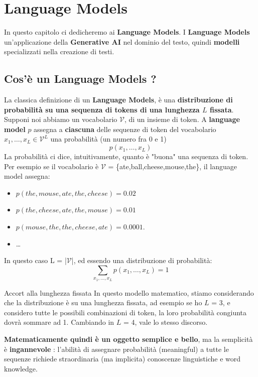 \chapter{Language Models}
In questo capitolo ci dedicheremo ai \textbf{Language Models}.
I \textbf{Language Models} un'applicazione della \textbf{Generative AI} nel dominio del testo, quindi \textbf{modelli} specializzati nella creazione di testi.
\section{Cos'è un Language Models ?}
La classica definizione di un \textbf{Language Models}, è una \textbf{distribuzione di probabilità su una sequenza di tokens di una lunghezza $L$ fissata}.
Supponi noi abbiamo un vocabolario $\mathcal{V}$, di un insieme di token.
A \textbf{language model} $p$ assegna a \textbf{ciascuna} delle sequenze di token del vocabolario $x_1,\dots,x_L \in \mathcal{V}^L$ una probabilità (un numero fra 0 e 1)
\begin{equation}
    p(x_1,\dots,x_L)
\end{equation} 
La probabilità ci dice, intuitivamente, quanto è "buona" una sequenza di token.
Per esempio se il vocabolario è $\mathcal{V}$ = \{ate,ball,cheese,mouse,the\}, il language model assegna:
\begin{itemize}
    \item $p(the,mouse,ate,the,cheese)=0.02$
    \item $p(the,cheese,ate,the,mouse)=0.01$
    \item $p(mouse,the,the,cheese,ate)=0.0001.$
    \item \dots
\end{itemize}
In questo caso L = |$\mathcal{V}$|, ed essendo una distribuzione di probabilità:
\begin{equation}
    \sum_{x_1,\dots,x_L}p(x_1,\dots,x_L) = 1
\end{equation}
\begin{warning}{Accort alla lunghezza fissata}
In questo modello matematico, stiamo considerando che la distribuzione è su una lunghezza fissata, ad esempio se ho $L$ = 3, e considero
tutte le possibili combinazioni di token, la loro probabilità congiunta dovrà sommare ad 1.
Cambiando in $L$ = 4, vale lo stesso discorso.
\end{warning}


\textbf{Matematicamente quindi è un oggetto semplice e bello}, ma la semplicità è \textbf{ingannevole} : l'abilità di assegnare probabilità (meaningful) a tutte le sequenze
richiede straordinaria (ma implicita) conoscenze linguistiche e word knowledge.


